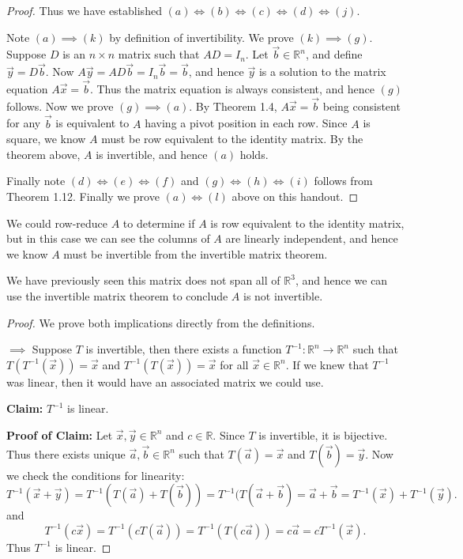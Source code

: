 \documentclass[12pt,letterpaper]{article}
\begin{document}
\begin{enumerate}
\begin{proof}
 Thus we have established $(a) \iff (b) \iff (c) \iff (d) \iff (j)$.
 
Note $(a)\implies (k)$ by definition of invertibility. We prove $(k) \implies (g)$. Suppose $D$ is an $n\times n$ matrix such that $AD=I_n$. Let $\vec{b} \in \mathbb{R}^n$, and define $\vec{y} =D\vec{b}$. Now $A\vec{y}=AD\vec{b} =I_n\vec{b} =\vec{b}$, and hence $\vec{y}$ is a solution to the matrix equation $A\vec{x}=\vec{b}$. Thus the matrix equation is always consistent, and hence $(g)$ follows. Now we prove $(g)\implies (a)$. By Theorem 1.4, $A\vec{x}=\vec{b}$ being consistent for any $\vec{b}$ is equivalent to $A$ having a pivot position in each row. Since $A$ is square, we know $A$ must be row equivalent to the identity matrix. By the theorem above, $A$ is invertible, and hence $(a)$ holds. 

Finally note $(d) \iff (e) \iff (f)$ and $(g) \iff (h) \iff (i)$ follows from Theorem 1.12. Finally we prove $(a)\iff (l)$ above on this handout.
 \end{proof}
  
  \Answer 
  
  \begin{enumerate}
  \Part We could row-reduce $A$ to determine if $A$ is row equivalent to the identity matrix, but in this case we can see the columns of $A$ are linearly independent, and hence we know $A$ must be invertible from the invertible matrix theorem.
  
  \Part We have previously seen this matrix does not span all of $\mathbb{R}^3$, and hence we can use the invertible matrix theorem to conclude $A$ is not invertible.
  
  \end{enumerate}
  
  \Answer
  
  \begin{proof} We prove both implications directly from the definitions.
  
  $\implies$ Suppose $T$ is invertible, then there exists a function $T^{-1} : \mathbb{R}^n \to \mathbb{R}^n$ such that $T(T^{-1}(\vec{x}))=\vec{x}$ and $T^{-1}(T(\vec{x}))=\vec{x}$ for all $\vec{x} \in \mathbb{R}^n$. If we knew that $T^{-1}$ was linear, then it would have an associated matrix we could use.
  
  {\bf Claim:} $T^{-1}$ is linear.
  
  {\bf Proof of Claim:} Let $\vec{x}, \vec{y} \in \mathbb{R}^n$ and $c \in \mathbb{R}$. Since $T$ is invertible, it is bijective. Thus there exists unique $\vec{a}, \vec{b} \in \mathbb{R}^n$ such that $T(\vec{a})=\vec{x}$ and $T(\vec{b})=\vec{y}$. Now we check the conditions for linearity: $$T^{-1}(\vec{x}+\vec{y})=T^{-1}(T(\vec{a})+T(\vec{b}))=T^{-1}(T(\vec{a}+\vec{b})=\vec{a}+\vec{b}=T^{-1}(\vec{x})+T^{-1}(\vec{y}).$$ and $$T^{-1}(c\vec{x})=T^{-1}(c T(\vec{a}))=T^{-1}(T(c\vec{a}))=c \vec{a} = c T^{-1}(\vec{x}).$$ Thus $T^{-1}$ is linear.
  

\end{proof}
\end{enumerate}
\end{document}

